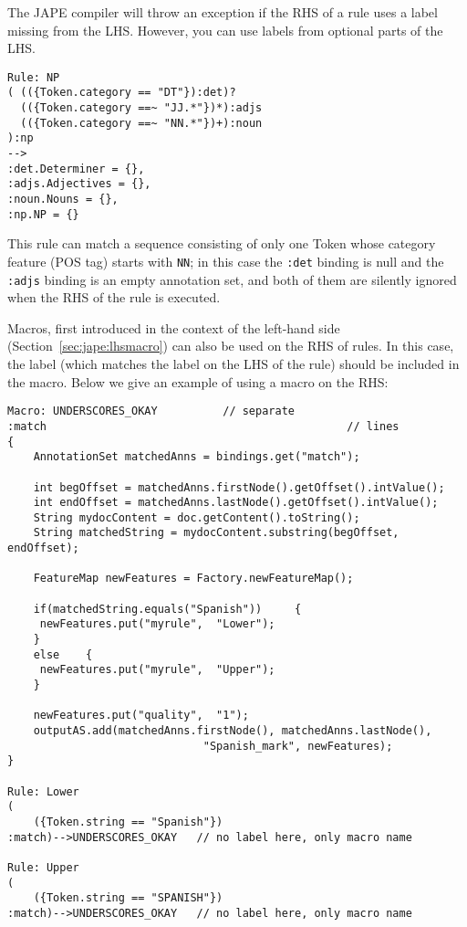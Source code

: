 The JAPE compiler will throw an exception if the RHS of a rule uses a label
missing from the LHS.  However, you can use labels from optional parts of the
LHS.
\begin{small}
\begin{verbatim}
Rule: NP
( (({Token.category == "DT"}):det)?
  (({Token.category ==~ "JJ.*"})*):adjs
  (({Token.category ==~ "NN.*"})+):noun
):np
-->
:det.Determiner = {},
:adjs.Adjectives = {},
:noun.Nouns = {},
:np.NP = {}
\end{verbatim}
\end{small}
This rule can match a sequence consisting of only one Token whose category
feature (POS tag) starts with \verb!NN!; in this case the \verb!:det! binding is
null and the \verb!:adjs! binding is an empty annotation set, and both of them
are silently ignored when the RHS of the rule is executed.

Macros, first introduced in the context of the left-hand side
(Section~\ref{sec:jape:lhsmacro}) can also be used on the RHS of rules. In this
case, the label (which matches the label on the LHS of the rule) should be
included in the macro.  Below we give an example of using a macro on the RHS:

\begin{small}
\begin{verbatim}
Macro: UNDERSCORES_OKAY          // separate
:match                                              // lines
{
    AnnotationSet matchedAnns = bindings.get("match");

    int begOffset = matchedAnns.firstNode().getOffset().intValue();
    int endOffset = matchedAnns.lastNode().getOffset().intValue();
    String mydocContent = doc.getContent().toString();
    String matchedString = mydocContent.substring(begOffset, endOffset);

    FeatureMap newFeatures = Factory.newFeatureMap();

    if(matchedString.equals("Spanish"))     {
     newFeatures.put("myrule",  "Lower");
    }
    else    {
     newFeatures.put("myrule",  "Upper");
    }

    newFeatures.put("quality",  "1");
    outputAS.add(matchedAnns.firstNode(), matchedAnns.lastNode(),
                              "Spanish_mark", newFeatures);
}

Rule: Lower
(
    ({Token.string == "Spanish"})
:match)-->UNDERSCORES_OKAY   // no label here, only macro name

Rule: Upper
(
    ({Token.string == "SPANISH"})
:match)-->UNDERSCORES_OKAY   // no label here, only macro name

 \end{verbatim}
\end{small}

